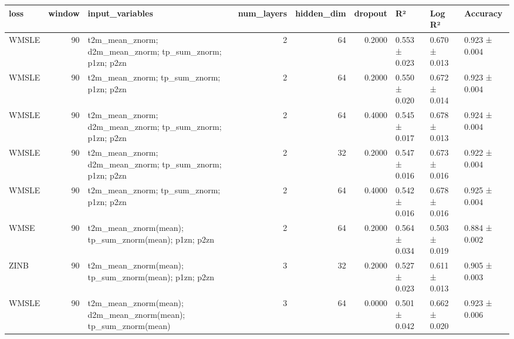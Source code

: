 \begin{tabular}{lrlrrrlll}
\toprule
loss & window & input\_variables & num\_layers & hidden\_dim & dropout & R² & Log R² & Accuracy \\
\midrule
WMSLE & 90 & t2m\_mean\_znorm; d2m\_mean\_znorm; tp\_sum\_znorm; p1zn; p2zn & 2 & 64 & 0.2000 & 0.553 ± 0.023 & 0.670 ± 0.013 & 0.923 ± 0.004 \\
WMSLE & 90 & t2m\_mean\_znorm; tp\_sum\_znorm; p1zn; p2zn & 2 & 64 & 0.2000 & 0.550 ± 0.020 & 0.672 ± 0.014 & 0.923 ± 0.004 \\
WMSLE & 90 & t2m\_mean\_znorm; d2m\_mean\_znorm; tp\_sum\_znorm; p1zn; p2zn & 2 & 64 & 0.4000 & 0.545 ± 0.017 & 0.678 ± 0.013 & 0.924 ± 0.004 \\
WMSLE & 90 & t2m\_mean\_znorm; d2m\_mean\_znorm; tp\_sum\_znorm; p1zn; p2zn & 2 & 32 & 0.2000 & 0.547 ± 0.016 & 0.673 ± 0.016 & 0.922 ± 0.004 \\
WMSLE & 90 & t2m\_mean\_znorm; tp\_sum\_znorm; p1zn; p2zn & 2 & 64 & 0.4000 & 0.542 ± 0.016 & 0.678 ± 0.016 & 0.925 ± 0.004 \\
WMSE & 90 & t2m\_mean\_znorm(mean); tp\_sum\_znorm(mean); p1zn; p2zn & 2 & 64 & 0.2000 & 0.564 ± 0.034 & 0.503 ± 0.019 & 0.884 ± 0.002 \\
ZINB & 90 & t2m\_mean\_znorm(mean); tp\_sum\_znorm(mean); p1zn; p2zn & 3 & 32 & 0.2000 & 0.527 ± 0.023 & 0.611 ± 0.013 & 0.905 ± 0.003 \\
WMSLE & 90 & t2m\_mean\_znorm(mean); d2m\_mean\_znorm(mean); tp\_sum\_znorm(mean) & 3 & 64 & 0.0000 & 0.501 ± 0.042 & 0.662 ± 0.020 & 0.923 ± 0.006 \\
\bottomrule
\end{tabular}
